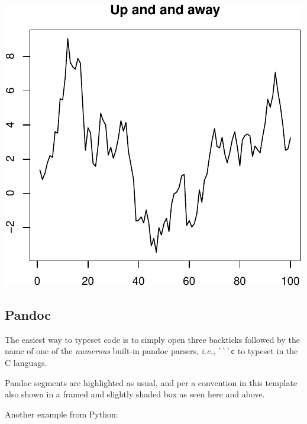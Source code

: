 \documentclass[letterpaper,9pt,twocolumn,twoside,]{pinp}
\begin{document}
\begin{center}\includegraphics{pinp_files/figure-latex/unnamed-chunk-2-1} \end{center}

\hypertarget{pandoc}{%
\subsection{Pandoc}\label{pandoc}}

The easiest way to typeset code is to simply open three backticks
followed by the name of one of the \emph{numerous} built-in pandoc
parsers, \emph{i.e.}, \verb|```c| to typeset in the C languags.

\begin{Shaded}
\begin{Highlighting}[]
\NormalTok{\}}
\end{Highlighting}
\end{Shaded}

Pandoc segments are highlighted as usual, and per a convention in this
template also shown in a framed and slightly shaded box as seen here and
above.

Another example from Python:

\begin{Shaded}
\begin{Highlighting}[]
\NormalTok{):}
    
   
\end{Highlighting}
\end{Shaded}
\end{document}
